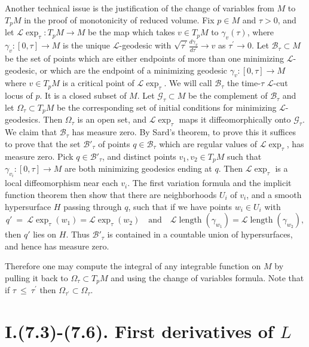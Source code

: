 \documentclass[12pt]{amsart}
\newcommand{\length}{\operatorname{length}}
\newcommand{\ra}{\rightarrow}
\numberwithin{equation}{section}
\theoremstyle{plain}
\theoremstyle{definition}
\theoremstyle{remark}
\begin{document}
Another technical issue is the justification of the change of variables
from $M$ to $T_pM$ in the proof of monotonicity of reduced volume.
Fix $p\in M$ and $\tau>0$, and let ${\mathcal L}\exp_\tau:T_pM\ra M$
be the map which takes $v\in T_pM$ to $\gamma_v(\tau)$, where
$\gamma_v:[0,\tau]\ra M$ is the unique ${\mathcal L}$-geodesic
with $\sqrt{\tau^\prime}\frac{d\gamma_v}{d\tau^\prime}\ra v$ as 
$\tau^\prime\ra 0$.
Let ${\mathcal B}_\tau \subset M$ be the set of points which are
either endpoints of more than one minimizing ${\mathcal L}$-geodesic,
or which are the endpoint of a minimizing geodesic $\gamma_v:[0,\tau]\ra M$
where $v\in T_pM$ is a critical point of ${\mathcal L}\exp_\tau$.
We will call ${\mathcal B}_\tau$ 
the time-$\tau$ ${\mathcal L}$-cut locus of $p$. It is a closed
subset of $M$.
Let ${\mathcal G}_\tau \subset M$ be the complement of ${\mathcal B}_\tau$ and
let $\Omega_\tau \subset T_pM$ be the corresponding set of initial
conditions for minimizing ${\mathcal L}$-geodesics.  
Then $\Omega_\tau$ is an open set, and ${\mathcal L}\exp_\tau$
maps it diffeomorphically onto ${\mathcal G}_\tau$.  We claim that
${\mathcal B}_\tau$ 
has measure zero.   By Sard's theorem, to prove this it suffices
to prove that the set ${\mathcal B}'_\tau$ of points 
$q\in {\mathcal B}_\tau$ which are 
regular values of ${\mathcal L}\exp_\tau$, has measure zero.
Pick $q\in {\mathcal B}'_\tau$, and distinct points $v_1,v_2\in T_pM$
such that $\gamma_{v_i}:[0,\tau]\ra M$ are both minimizing geodesics
ending at $q$.  Then ${\mathcal L}\exp_\tau$ is a local diffeomorphism
near each $v_i$. The first variation formula and the implicit function theorem
then show that there are neighborhoods
$U_i$ of $v_i$, and a smooth hypersurface $H$  passing through
$q$, such that if we have points $w_i\in U_i$ with 
\begin{equation}
q' \: = \: {\mathcal L}\exp_\tau(w_1)={\mathcal L}\exp_\tau(w_2)\quad 
\mbox{and}\quad{\mathcal L}\length(\gamma_{w_1})={\mathcal L}
\length(\gamma_{w_2}),
\end{equation}
then $q'$ lies on $H$.  Thus ${\mathcal B}'_\tau$ 
is contained in a countable union
of hypersurfaces, and hence has measure zero. 

Therefore one may compute the integral of any integrable function on $M$
by pulling it back to $\Omega_\tau \subset T_pM$ and using the change
of variables formula. 
Note that
if $\tau \: \le \: \tau^\prime$ then $\Omega_{\tau^\prime} \subset
\Omega_\tau$.


\section{I.(7.3)-(7.6). First derivatives of $L$}
\end{document}
